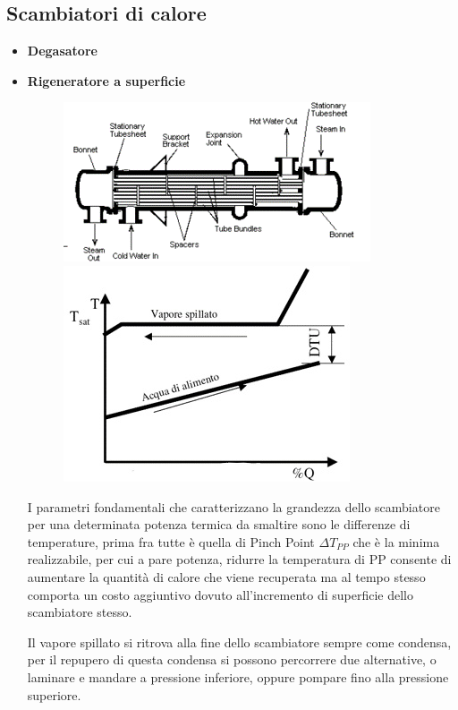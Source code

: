 \begin{adjustwidth}{2in}{}
\subsection{Scambiatori di calore}
		\begin{itemize}
			\item \textbf{Degasatore}
			\item \textbf{Rigeneratore a superficie} 
			\begin{figure}[H]
				\centering
				\includegraphics[width=0.5\linewidth]{immagini/rigeneratore1.png}
				\includegraphics[width=0.3\linewidth]{immagini/rigeneratore2}
				\label{fig:rigeneratore1}
			\end{figure}
			I parametri fondamentali che caratterizzano  la grandezza dello scambiatore per una determinata potenza termica da smaltire sono le differenze di  temperature, prima fra tutte è quella di Pinch Point $\Delta T_{PP}$ che è la minima realizzabile, per cui a pare potenza, ridurre la temperatura di PP consente di aumentare la quantità di calore che viene recuperata ma al tempo stesso comporta un  costo aggiuntivo dovuto all'incremento di superficie dello scambiatore stesso. 
			
			Il vapore spillato si ritrova alla fine dello scambiatore sempre come condensa, per il  repupero di questa condensa si possono percorrere due alternative, o laminare e mandare a pressione inferiore, oppure pompare fino alla pressione superiore. 			
		\end{itemize}

\end{adjustwidth}
